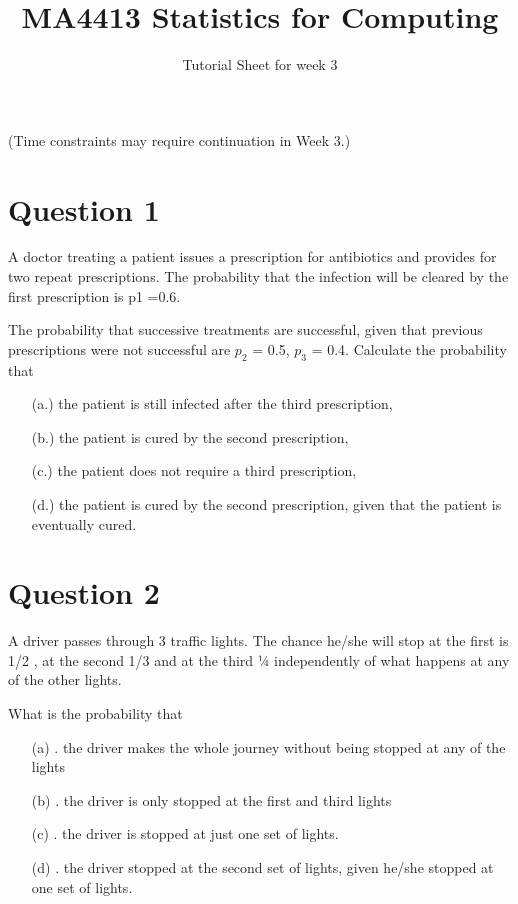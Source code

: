 \documentclass[]{article}
\title{MA4413 Statistics for Computing}
\author{Tutorial Sheet for week 3}
\begin{document}
\maketitle

(Time constraints may require continuation in Week 3.)

\section*{Question 1} %

A doctor treating a patient issues a prescription for antibiotics and provides for two repeat prescriptions. The probability that the infection will be cleared by the first prescription is p1 =0.6. 


The probability that successive treatments are successful, given that previous prescriptions were not successful are $p_2$ = 0.5, $p_3$ = 0.4. Calculate the probability that  

\begin{itemize}   
\item[(a.)] the patient is still infected after the third prescription,
\item[(b.)] the patient is cured by the second prescription,
\item[(c.)] the patient does not require a third prescription,
\item[(d.)] the patient is cured by the second prescription, given that the patient is eventually cured.
\end{itemize}
\section*{Question 2}
A driver passes through 3 traffic lights. The chance he/she will stop at the first is 1/2 , at the second 1/3 and at the third ¼ independently of what happens at any of the other lights. 

What is the probability that
\begin{itemize}
\item[(a)]. the driver makes the whole journey without being stopped at any of the lights
\item[(b)]. the driver is only stopped at the first and third lights
\item[(c)]. the driver is stopped at just one set of lights.
\item[(d)]. the driver stopped at the second set of lights, given he/she stopped at one set of lights.
\end{itemize}
\end{document}
